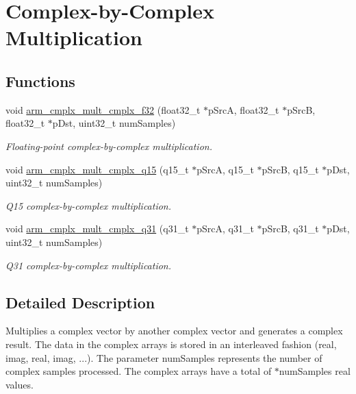 \hypertarget{group__CmplxByCmplxMult}{}\section{Complex-\/by-\/\+Complex Multiplication}
\label{group__CmplxByCmplxMult}
\subsection*{Functions}
\begin{DoxyCompactItemize}
\item 
void \hyperlink{group__CmplxByCmplxMult_ga14b47080054a1ba1250a86805be1ff6b}{arm\+\_\+cmplx\+\_\+mult\+\_\+cmplx\+\_\+f32} (float32\+\_\+t $\ast$p\+SrcA, float32\+\_\+t $\ast$p\+SrcB, float32\+\_\+t $\ast$p\+Dst, uint32\+\_\+t num\+Samples)
\begin{DoxyCompactList}\small\item\em Floating-\/point complex-\/by-\/complex multiplication. \end{DoxyCompactList}\item 
void \hyperlink{group__CmplxByCmplxMult_ga67e96abfc9c3e30efb70a2ec9d0fe7e8}{arm\+\_\+cmplx\+\_\+mult\+\_\+cmplx\+\_\+q15} (q15\+\_\+t $\ast$p\+SrcA, q15\+\_\+t $\ast$p\+SrcB, q15\+\_\+t $\ast$p\+Dst, uint32\+\_\+t num\+Samples)
\begin{DoxyCompactList}\small\item\em Q15 complex-\/by-\/complex multiplication. \end{DoxyCompactList}\item 
void \hyperlink{group__CmplxByCmplxMult_ga1829e50993a90742de225a0ce4213838}{arm\+\_\+cmplx\+\_\+mult\+\_\+cmplx\+\_\+q31} (q31\+\_\+t $\ast$p\+SrcA, q31\+\_\+t $\ast$p\+SrcB, q31\+\_\+t $\ast$p\+Dst, uint32\+\_\+t num\+Samples)
\begin{DoxyCompactList}\small\item\em Q31 complex-\/by-\/complex multiplication. \end{DoxyCompactList}\end{DoxyCompactItemize}


\subsection{Detailed Description}
Multiplies a complex vector by another complex vector and generates a complex result. The data in the complex arrays is stored in an interleaved fashion (real, imag, real, imag, ...). The parameter {\ttfamily num\+Samples} represents the number of complex samples processed. The complex arrays have a total of {$\ast$num\+Samples} real values.

